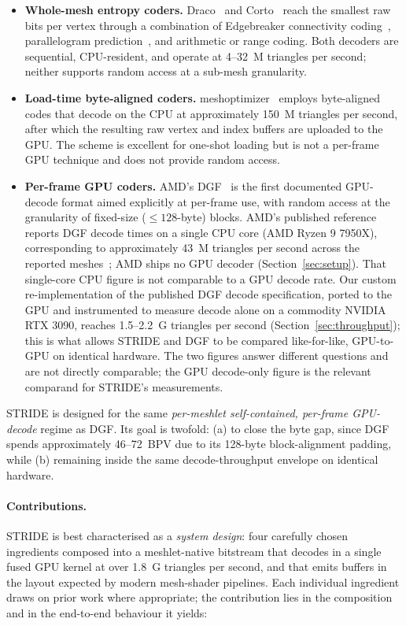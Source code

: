\documentclass[pdflatex,sn-vancouver-num]{sn-jnl}%
\theoremstyle{thmstyleone}%
\theoremstyle{thmstyletwo}%
\theoremstyle{thmstylethree}%
\begin{document}
\begin{itemize}
\item \textbf{Whole-mesh entropy coders.} Draco~\cite{ref02_draco} and Corto~\cite{ref10_corto} reach the smallest raw bits per vertex through a combination of Edgebreaker connectivity coding~\cite{ref04_edgebreaker_1999}, parallelogram prediction~\cite{ref05_touma_gotsman_1998}, and arithmetic or range coding. Both decoders are sequential, CPU-resident, and operate at 4--32~M triangles per second; neither supports random access at a sub-mesh granularity.
\item \textbf{Load-time byte-aligned coders.} meshoptimizer~\cite{ref03_meshoptimizer} employs byte-aligned codes that decode on the CPU at approximately 150~M triangles per second, after which the resulting raw vertex and index buffers are uploaded to the GPU. The scheme is excellent for one-shot loading but is not a per-frame GPU technique and does not provide random access.
\item \textbf{Per-frame GPU coders.} AMD's DGF~\cite{ref01_amd_dgf_hpg2024} is the first documented GPU-decode format aimed explicitly at per-frame use, with random access at the granularity of fixed-size ($\le 128$-byte) blocks. AMD's published reference reports DGF decode times on a single CPU core (AMD Ryzen 9 7950X), corresponding to approximately 43~M triangles per second across the reported meshes~\cite{ref09_amd_dgf_blog}; AMD ships no GPU decoder (Section~\ref{sec:setup}). That single-core CPU figure is not comparable to a GPU decode rate. Our custom re-implementation of the published DGF decode specification, ported to the GPU and instrumented to measure decode alone on a commodity NVIDIA RTX 3090, reaches 1.5--2.2~G triangles per second (Section~\ref{sec:throughput}); this is what allows STRIDE and DGF to be compared like-for-like, GPU-to-GPU on identical hardware. The two figures answer different questions and are not directly comparable; the GPU decode-only figure is the relevant comparand for STRIDE's measurements.
\end{itemize}

STRIDE is designed for the same \emph{per-meshlet self-contained, per-frame GPU-decode} regime as DGF. Its goal is twofold: (a) to close the byte gap, since DGF spends approximately 46--72~BPV due to its 128-byte block-alignment padding, while (b) remaining inside the same decode-throughput envelope on identical hardware.

\paragraph{Contributions.}
STRIDE is best characterised as a \emph{system design}: four carefully chosen ingredients composed into a meshlet-native bitstream that decodes in a single fused GPU kernel at over 1.8~G triangles per second, and that emits buffers in the layout expected by modern mesh-shader pipelines. Each individual ingredient draws on prior work where appropriate; the contribution lies in the composition and in the end-to-end behaviour it yields:
\end{document}
